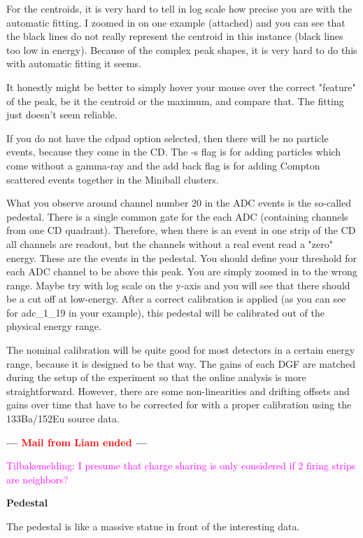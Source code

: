 \documentclass[twoside,english]{uiofysmaster/uiofysmaster}
\begin{document}
For the centroids, it is very hard to tell in log scale how precise you are with the automatic fitting. I zoomed in on one example (attached) and you can see that the black lines do not really represent the centroid in this instance (black lines too low in energy). Because of the complex peak shapes, it is very hard to do this with automatic fitting it seems. 

It honestly might be better to simply hover your mouse over the correct "feature" of the peak, be it the centroid or the maximum, and compare that. The fitting just doesn't seem reliable.

If you do not have the cdpad option selected, then there will be no particle events, because they come in the CD. The -s flag is for adding particles which come without a gamma-ray and the add back flag is for adding Compton scattered events together in the Miniball clusters. 

What you observe around channel number 20 in the ADC events is the so-called pedestal. There is a single common gate for the each ADC (containing channels from one CD quadrant). Therefore, when there is an event in one strip of the CD all channels are readout,  but the channels without a real event read a "zero" energy. These are the events in the pedestal. You should define your threshold for each ADC channel to be above this peak. You are simply zoomed in to the wrong range. Maybe try with log scale on the y-axis and you will see that there should be a cut off at low-energy. After a correct calibration is applied (as you can see for adc\_1\_19 in your example), this pedestal will be calibrated out of the physical energy range.

The nominal calibration will be quite good for most detectors in a certain energy range, because it is designed to be that way. The gains of each DGF are matched during the setup of the experiment so that the online analysis is more straightforward. However, there are some non-linearities and drifting offsets and gains over time that have to be corrected for with a proper calibration using the 133Ba/152Eu source data. 

\textbf{--- \textcolor{red}{Mail from Liam ended} ---}

\textcolor{Magenta}{Tilbakemelding: \newline 
I presume that charge sharing is only considered if 2 firing strips are neighbors?
}

\textbf{Pedestal}

The pedestal is like a massive statue in front of the interesting data. 
\end{document}
